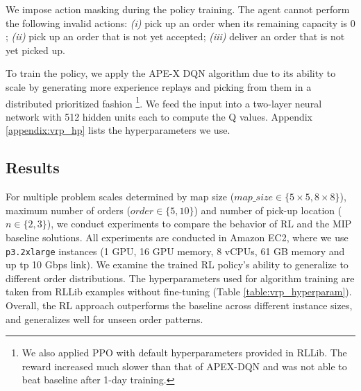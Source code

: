 
We impose action masking during the policy training. The agent cannot perform the following invalid actions: \textit{(i)} pick up an order when its remaining capacity is $0$; \textit{(ii)} pick up an order that is not yet accepted; \textit{(iii)} deliver an order that is not yet picked up. 

To train the policy, we apply the APE-X \cite{horgan2018distributed} DQN algorithm due to its ability to scale by generating more experience replays and picking from them in a distributed prioritized fashion \footnote{We also applied PPO with default hyperparameters provided in RLLib. The reward increased much slower than that of APEX-DQN and was not able to beat baseline after 1-day training.}. We feed the input into a two-layer neural network with 512 hidden units each to compute the Q values. Appendix \ref{appendix:vrp_hp} lists the hyperparameters we use.

\subsection{Results}
For multiple problem scales determined by map size ($map\_size \in \{5 \times 5, 8 \times 8\}$), maximum number of orders ($order \in \{5, 10\}$) and number of pick-up location ($n \in \{2, 3\}$), we conduct experiments to compare the behavior of RL and the MIP baseline solutions. All experiments are conducted in Amazon EC2, where we use \texttt{p3.2xlarge} instances (1 GPU, 16 GPU memory, 8 vCPUs, 61  GB memory and up tp 10 Gbps link). We examine the trained RL policy's ability to generalize to different order distributions. The hyperparameters used for algorithm training are taken from RLLib examples without fine-tuning (Table \ref{table:vrp_hyperparam}). Overall, the RL approach outperforms the baseline across different instance sizes, and generalizes well for unseen order patterns. 

